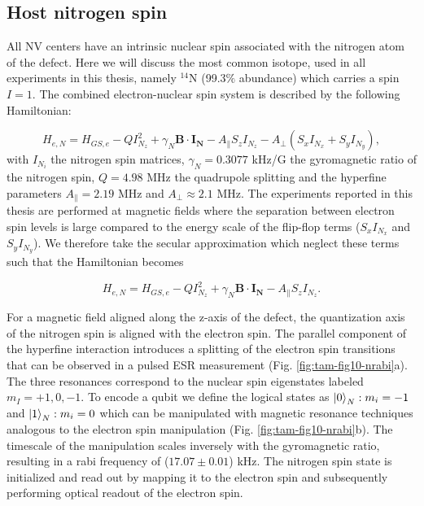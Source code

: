 \subsection{Host nitrogen spin}
All NV centers have an intrinsic nuclear spin associated with the nitrogen atom of the defect. Here we will discuss the most common isotope, used in all experiments in this thesis, namely $^{14}$N (99.3$\%$ abundance) which carries a spin $I = 1$. The combined electron-nuclear spin system is described by the following Hamiltonian:

\begin{equation}
H_{e,N} = H_{GS,e} - Q I_{N_z}^2 + \gamma_N \mathbf{B} \cdot \mathbf{I_N} - A_{\parallel} S_z I_{N_z} - A_{\perp}(S_x I_{N_x}+S_y I_{N_y}),
\end{equation}
with $I_{N_i}$ the nitrogen spin matrices, $\gamma_N = 0.3077$ kHz/G the gyromagnetic ratio of the nitrogen spin, $Q = 4.98$ MHz the quadrupole splitting and the hyperfine parameters $A_{\parallel} = 2.19$ MHz and $A_{\perp} \approx 2.1$ MHz. The experiments reported in this thesis are performed at magnetic fields where the separation between electron spin levels is large compared to the energy scale of the flip-flop terms ($S_x I_{N_x}$ and $S_y I_{N_y}$). We therefore take the secular approximation which neglect these terms such that the Hamiltonian becomes

\begin{equation}
H_{e,N} = H_{GS,e} - Q I_{N_z}^2 + \gamma_N \mathbf{B} \cdot \mathbf{I_N} - A_{\parallel} S_z I_{N_z}.
\end{equation}

For a magnetic field aligned along the z-axis of the defect, the quantization axis of the nitrogen spin is aligned with the electron spin. The parallel component of the hyperfine interaction introduces a splitting of the electron spin transitions that can be observed in a pulsed ESR measurement (Fig. \ref{fig:tam-fig10-nrabi}a). The three resonances correspond to the nuclear spin eigenstates labeled $m_I = +1, 0, -1$. To encode a qubit we define the logical states as $\left|0\right>_N : m_i = -1$ and $\left|1\right>_N : m_i = 0$ which can be manipulated with magnetic resonance techniques analogous to the electron spin manipulation (Fig. \ref{fig:tam-fig10-nrabi}b). The timescale of the manipulation scales inversely with the gyromagnetic ratio, resulting in a rabi frequency of ($17.07 \pm 0.01$) kHz. The nitrogen spin state is initialized and read out by mapping it to the electron spin and subsequently performing optical readout of the electron spin.


